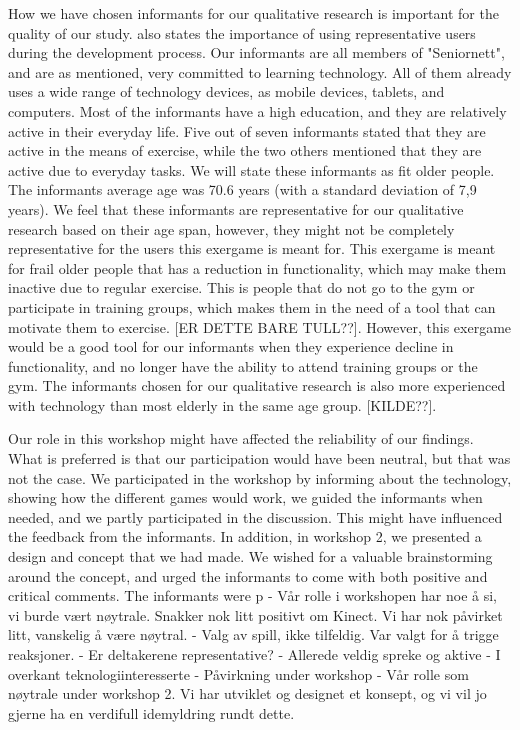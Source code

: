 How we have chosen informants for our qualitative research is important for the quality of our study. \cite{gregor} also states the importance of using representative users during the development process. Our informants are all members of "Seniornett", and are as mentioned, very committed to learning technology. All of them already uses a wide range of technology devices, as mobile devices, tablets, and computers. Most of the informants have a high education, and they are relatively active in their everyday life. Five out of seven informants stated that they are active in the means of exercise, while the two others mentioned that they are active due to everyday tasks. We will state these informants as fit older people. The informants average age was 70.6 years (with a standard deviation of 7,9 years). We feel that these informants are representative for our qualitative research based on their age span, however, they might not be completely representative for the users this exergame is meant for. This exergame is meant for frail older people that has a reduction in functionality, which may make them inactive due to regular exercise. This is people that do not go to the gym or participate in training groups, which makes them in the need of a tool that can motivate them to exercise. [ER DETTE BARE TULL??]. However, this exergame would be a good tool for our informants when they experience decline in functionality, and no longer have the ability to attend training groups or the gym. The informants chosen for our qualitative research is also more experienced with technology than most elderly in the same age group. [KILDE??].  

Our role in this workshop might have affected the reliability of our findings. What is preferred is that our participation would have been neutral, but that was not the case. We participated in the workshop by informing about the technology, showing how the different games would work, we guided the informants when needed, and we partly participated in the discussion. This might have influenced the feedback from the informants. In addition, in workshop 2, we presented a design and concept that we had made. We wished for a valuable brainstorming around the concept, and urged the informants to come with both positive and critical comments. The informants were p
- Vår rolle i workshopen har noe å si, vi burde vært nøytrale. Snakker nok litt positivt om Kinect. Vi har nok påvirket litt, vanskelig å være nøytral.
- Valg av spill, ikke tilfeldig. Var valgt for å trigge reaksjoner.
- Er deltakerene representative?
	- Allerede veldig spreke og aktive
	- I overkant teknologiinteresserte
- Påvirkning under workshop
- Vår rolle som nøytrale under workshop 2. Vi har utviklet og designet et konsept, og vi vil jo gjerne ha en verdifull idemyldring rundt dette.  

